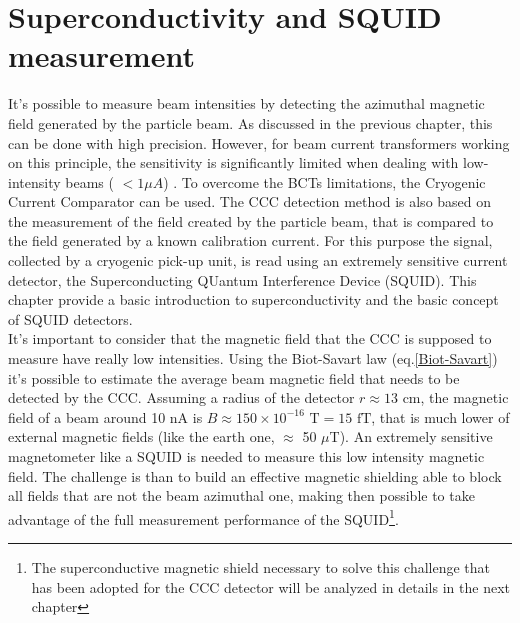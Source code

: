 \documentclass[12pt,a4paper]{report}
\begin{document}
	\chapter{Superconductivity and SQUID measurement}
	It's possible to measure beam intensities by detecting the azimuthal magnetic field generated by the particle beam. As discussed in the previous chapter, this can be done with high precision. However, for beam current transformers working on this principle, the sensitivity is significantly limited when dealing with low-intensity beams ( $<1 \mu A$) \cite{Fork}. To overcome the BCTs limitations, the Cryogenic Current Comparator can be used. The CCC detection method is also based on the measurement of the field created by the particle beam, that is compared to the field generated by a known calibration current. For this purpose the signal, collected by a cryogenic pick-up unit, is read using an extremely sensitive current detector, the Superconducting QUantum Interference Device (SQUID). This chapter provide a basic introduction to superconductivity and the basic concept of SQUID detectors.\\
	It's important to consider that the magnetic field that the CCC is supposed to measure  have really low intensities. Using the Biot-Savart law (eq.\ref{Biot-Savart}) it's possible to estimate the average beam magnetic field that needs to be detected by the CCC. Assuming a radius of the detector $r \approx 13 $ cm, the magnetic field of a beam around 10 nA is $B \approx 150 \times 10^{-16}\text{ T} = 15\text{ fT}$, that is much lower of external magnetic fields (like the earth one, $\approx$ 50 $\mu$T). An extremely sensitive magnetometer like a SQUID is needed to measure this low intensity magnetic field. The challenge is than to build an effective magnetic shielding able to block all fields that are not the beam azimuthal one, making then possible to take advantage of the full measurement performance of the SQUID\footnote{The superconductive magnetic shield necessary to solve this challenge that has been adopted for the CCC detector will be analyzed in details in the next chapter}.
\end{document}
